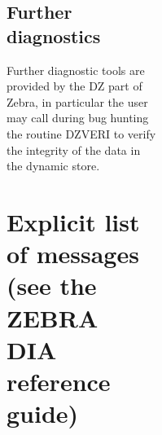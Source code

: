 \begin{figure}
\begin{figure}
\begin{figure}
\begin{figure}
\subsection{Further diagnostics}
\par Further diagnostic tools are provided by the DZ part of Zebra,
in particular the user may call during bug hunting the routine
DZVERI to verify the integrity of the data in the dynamic store.
\section{Explicit list of messages (see the ZEBRA DIA reference guide)}

\end{figure}
\end{figure}
\end{figure}
\end{figure}
